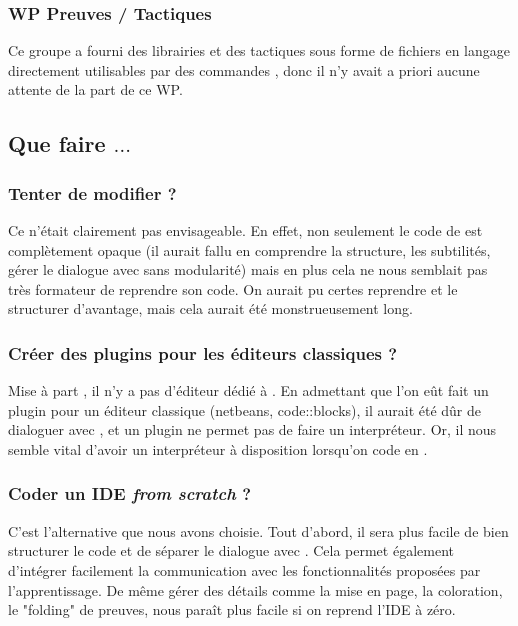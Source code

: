 		\subsubsection{WP Preuves / Tactiques}
			Ce groupe a fourni des librairies et des tactiques sous forme de fichiers en langage \coq directement utilisables par des commandes \coq, donc il n'y avait a priori aucune attente de la part de ce WP.

    \subsection{Que faire $\ldots$}

        \subsubsection{Tenter de modifier \coqide ?}

            Ce n'était clairement pas envisageable.
            En effet, non seulement le code de \coqide est complètement opaque (il aurait fallu en comprendre la structure, les subtilités, gérer le dialogue avec \coq sans modularité) mais en plus cela ne nous semblait pas très formateur de reprendre son code.
            On aurait pu certes reprendre \coqide et le structurer d'avantage, mais cela aurait été monstrueusement long.
			
        \subsubsection{Créer des plugins pour les éditeurs classiques ?}

			Mise à part \coqide, il n'y a pas d'éditeur dédié à \coq. En admettant que l'on eût fait un plugin pour un éditeur classique (netbeans, code::blocks), il aurait été dûr de dialoguer avec \coqtop, et un plugin ne permet pas de faire un interpréteur. Or, il nous semble vital d'avoir un interpréteur à disposition lorsqu'on code en \coq.
			
        \subsubsection{Coder un IDE \textit{from scratch} ?}
        
			C'est l'alternative que nous avons choisie. 
			Tout d'abord, il sera plus facile de bien structurer le code et de séparer le dialogue avec \coq.
			Cela permet également d'intégrer facilement la communication avec les fonctionnalités proposées par l'apprentissage.
			De même gérer des détails comme la mise en page, la coloration, le "folding" de preuves, nous paraît plus facile si on reprend l'IDE à zéro.
			
